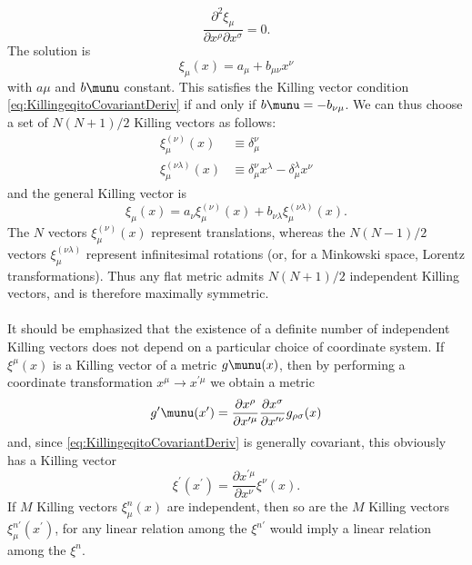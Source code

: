 \begin{equation}
	\frac{\partial^2 \xi_\mu}{\partial x^\rho \partial x^\sigma} = 0.
\end{equation}
The solution is 
\begin{equation}
\xi_\mu(x) = a_\mu + b_{\mu \nu} x^\nu
\end{equation}
with $a\mu$ and $b\munu$ constant. This satisfies the Killing vector condition \ref{eq:KillingeqitoCovariantDeriv} if and only if $b\munu = - b_{\nu \mu}$. We can thus choose a set of $N(N+1)/2$ Killing vectors as follows:
\begin{align*}
	\xi^{(\nu)}_\mu (x) &\equiv \delta^\nu_\mu \\
	\xi^{(\nu \lambda)}_\mu(x) &\equiv \delta^\nu_\mu x^\lambda - \delta^\lambda_\mu x^\nu
\end{align*}
and the general Killing vector is
\begin{equation}
	\xi_\mu(x) =a_\nu \xi^{(\nu)}_\mu (x) + b_{\nu \lambda} \xi^{(\nu \lambda )}_\mu(x).
\end{equation}
The $N$ vectors $\xi^{(\nu)}_\mu(x)$ represent translations, whereas the $N(N-1)/2$ vectors $\xi^{(\nu \lambda)}_\mu$ represent infinitesimal rotations (or, for a Minkowski space, Lorentz transformations). Thus any flat metric admits $N(N+1)/2$ independent Killing vectors, and is therefore maximally symmetric.\\
\\
	It should be emphasized that the existence of a definite number of independent Killing vectors does not depend on a particular choice of coordinate system. If $\xi^\mu(x)$ is a Killing vector of a metric $g\munu(x)$, then by performing a coordinate transformation $x^\mu \rightarrow x^{\prime \mu}$ we obtain a metric
\begin{equation}
g^\prime\munu(x^\prime) = \frac{\partial x^\rho}{\partial x^{\prime \mu}}\frac{\partial x^\sigma}{\partial x^{\prime \nu}} g_{\rho \sigma}(x)
\end{equation}
and, since \ref{eq:KillingeqitoCovariantDeriv} is generally covariant, this obviously has a Killing vector
\begin{equation}
\xi^\prime(x^\prime) = \frac{\partial x^{\prime \mu}}{\partial x^\nu} \xi^\nu(x).
\end{equation}
If $M$ Killing vectors $\xi^n_\mu(x)$ are independent, then so are the $M$ Killing vectors $\xi^{n \prime}_\mu(x^\prime)$, for any linear relation among the $\xi^{n \prime}$ would imply a linear relation among the $\xi^n$. 

